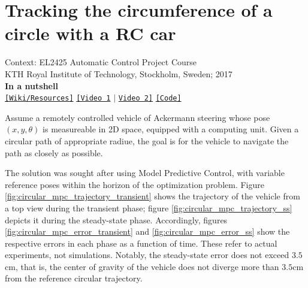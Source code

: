 \chapter{Tracking the circumference of a circle with a RC car}

\noindent Context: EL2425 Automatic Control Project Course\\
\noindent KTH Royal Institute of Technology, Stockholm, Sweden; 2017\\

\noindent \textbf{In a nutshell}\\
\noindent \href{https://github.com/li9i/HT16_P2_EL2425_resources}{\texttt{[Wiki/Resources]}} \href{https://www.youtube.com/watch?v=Vh1huYlyD_8}{\texttt{[Video 1}} $|$ \href{https://youtu.be/937OZez1iN8?t=69}{\texttt{Video 2]}} \href{https://github.com/li9i/HT16_P2_EL2425}{\texttt{[Code]}} \\


\begin{problem}
Assume a remotely controlled vehicle of Ackermann steering whose pose
$(x,y,\theta)$ is measureable in 2D space, equipped with a computing unit.
Given a circular path of appropriate radiue, the goal is for the vehicle to
navigate the path as closely as possible.
\end{problem}

The solution was sought after using Model Predictive Control, with variable
reference poses within the horizon of the optimization problem. Figure
\ref{fig:circular_mpc_trajectory_transient} shows the trajectory of the vehicle
from a top view during the transient phase; figure
\ref{fig:circular_mpc_trajectory_ss} depicts it during the steady-state phase.
Accordingly, figures \ref{fig:circular_mpc_error_transient} and
\ref{fig:circular_mpc_error_ss} show the respective errors in each phase as a
function of time. These refer to actual experiments, not simulations.  Notably,
the steady-state error does not exceed $3.5$cm, that is, the center of gravity
of the vehicle does not diverge more than $3.5$cm from the reference circular
trajectory.

